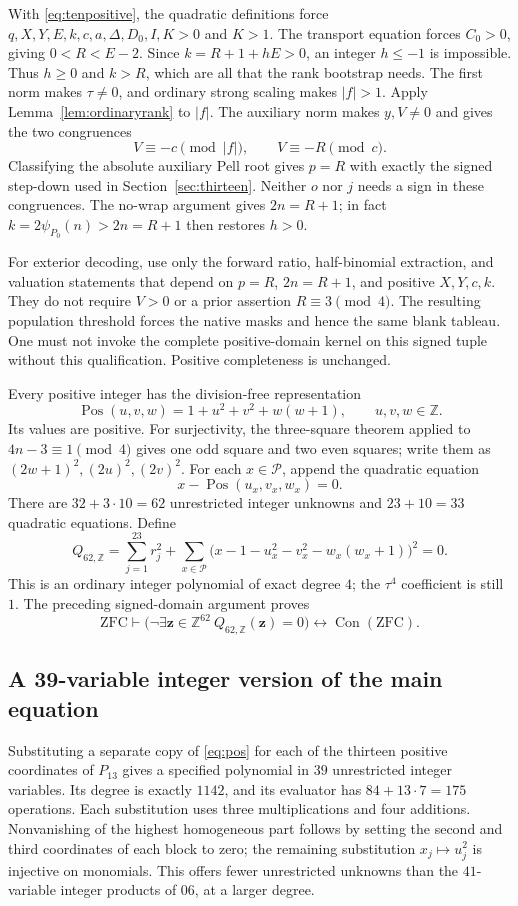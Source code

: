 \documentclass[11pt,a4paper]{article}
\theoremstyle{remark}\newtheorem{remark}[theorem]{Remark}
\newcommand{\Z}{\mathbb Z}
\newcommand{\Con}{\operatorname{Con}}
\begin{document}
With \eqref{eq:tenpositive}, the quadratic definitions force
$q,X,Y,E,k,c,a,\Delta,D_0,I,K>0$ and $K>1$.
The transport equation forces $C_0>0$, giving $0<R<E-2$.
Since $k=R+1+hE>0$, an integer $h\le-1$ is impossible.
Thus $h\ge0$ and $k>R$, which are all that the rank bootstrap needs.
The first norm makes $\tau\ne0$, and ordinary strong scaling
makes $|f|>1$. Apply Lemma~\ref{lem:ordinaryrank} to $|f|$.
The auxiliary norm makes $y,V\ne0$ and gives the two congruences
\[
 V\equiv-c\pmod{|f|},\qquad V\equiv-R\pmod c.
\]
Classifying the absolute auxiliary Pell root gives $p=R$ with
exactly the signed step-down used in Section~\ref{sec:thirteen}.
Neither $o$ nor $j$ needs a sign in these congruences. The no-wrap
argument gives $2n=R+1$; in fact $k=2\psi_{P_0}(n)>2n=R+1$
then restores $h>0$.

For exterior decoding, use only the forward ratio, half-binomial
extraction, and valuation statements that depend on $p=R$,
$2n=R+1$, and positive $X,Y,c,k$. They do not require $V>0$ or a
prior assertion $R\equiv3\pmod4$. The resulting population threshold
forces the native masks and hence the same blank tableau. One must not
invoke the complete positive-domain kernel on this signed tuple
without this qualification. Positive completeness is unchanged.

Every positive integer has the division-free representation
\begin{equation}
 \operatorname{Pos}(u,v,w)=1+u^2+v^2+w(w+1),\qquad u,v,w\in\Z.
 \label{eq:pos}
\end{equation}
Its values are positive. For surjectivity, the three-square theorem
applied to $4n-3\equiv1\pmod4$ gives one odd square and two even
squares; write them as $(2w+1)^2,(2u)^2,(2v)^2$.
For each $x\in\mathcal P$, append the quadratic equation
\[
 x-\operatorname{Pos}(u_x,v_x,w_x)=0.
\]
There are $32+3\cdot10=62$ unrestricted integer unknowns and
$23+10=33$ quadratic equations. Define
\begin{equation}
 \boxed{\quad Q_{62,\Z}=\sum_{j=1}^{23}r_j^2+
 \sum_{x\in\mathcal P}
 \bigl(x-1-u_x^2-v_x^2-w_x(w_x+1)\bigr)^2=0.\quad}
 \label{eq:quartic62}
\end{equation}
This is an ordinary integer polynomial of exact degree $4$; the
$\tau^4$ coefficient is still $1$. The preceding signed-domain
argument proves
\[
 \mathrm{ZFC}\vdash
 \bigl(\neg\exists\mathbf z\in\Z^{62}\ Q_{62,\Z}(\mathbf z)=0\bigr)
 \longleftrightarrow\Con(\mathrm{ZFC}).
\]

\subsection{A 39-variable integer version of the main equation}
Substituting a separate copy of \eqref{eq:pos} for each of the
thirteen positive coordinates of $P_{13}$ gives a specified
polynomial in $39$ unrestricted integer variables. Its degree is
exactly $1142$, and its evaluator has $84+13\cdot7=175$
operations. Each substitution uses three multiplications and four
additions. Nonvanishing of the highest homogeneous part follows
by setting the second and third coordinates of each block to zero;
the remaining substitution $x_j\mapsto u_j^2$ is injective on
monomials. This offers fewer unrestricted unknowns than the
$41$-variable integer products of 06, at a larger degree.
\end{document}
